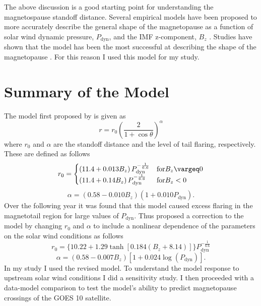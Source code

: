 \documentclass[12pt, letterpaper]{article}
\begin{document}
The above discussion is a good starting point for understanding the magnetospause standoff distance. Several empirical models have been proposed to more accurately describe the general shape of the magnetopause as a function of solar wind dynamic pressure, $P_{\text{dyn}}$, and the IMF z-component, $B_{z}$ \citep{Petrinec93} \citep{Shue97} \citep{Shue98} \citep{Kuznetsov98} \citep{Roelof98}. Studies have shown that the \citet {Shue98} model has been the most successful at describing the shape of the magnetopause \citep{Shue00}. For this reason I used this model for my study.

\section{Summary of the Model}
\label{sec:summary}
The model first proposed by \citet{Shue97} is given as
\begin{equation}
r = r_{0} \left( \frac{2}{1 + \cos \theta } \right) ^{\alpha}
\end{equation}
where $r_{0}$ and $\alpha$ are the standoff distance and the level of tail flaring, respectively. These are defined as follows
\begin{equation}
 r_{0} =
  \begin{cases}
   \left( 11.4 + 0.013 B_{z} \right) P_{\text{dyn}}^{-\frac{1}{6.6}} & \text{for} B_{z} \vargeq 0 \\
   \left( 11.4 + 0.14 B_{z} \right) P_{\text{dyn}}^{-\frac{1}{6.6}} & \text{for} B_{z} < 0
  \end{cases}
\end{equation}
\begin{equation}
\alpha = \left( 0.58 - 0.010 B_{z} \right) \left( 1 + 0.010 P_{\text{dyn}} \right ).
\end{equation}
Over the following year it was found that this model caused excess flaring in the magnetotail region for large values of $P_{\text{dyn}}$. Thus \citet{Shue98} proposed a correction to the model by changing $r_{0}$ and $\alpha$ to include a nonlinear dependence of the parameters on the solar wind conditions as follows
\begin{equation}
r_{0} = \lbrace 10.22 + 1.29 \tanh \left[ 0.184 \left( B_{z} + 8.14 \right) \right] \rbrace P_{\text{dyn}}^{-\frac{1}{6.6}}
\end{equation}
\begin{equation}
\alpha = \left( 0.58 - 0.007 B_{z} \right) \left[ 1 + 0.024 \log \left( P_{\text{dyn}} \right ) \right].
\end{equation}
In my study I used the \citet{Shue98} revised model. To understand the model response to upstream solar wind conditions I did a sensitivity study. I then proceeded with a data-model comparison to test the model's ability to predict magnetopause crossings of the GOES 10 satellite.
\end{document}
